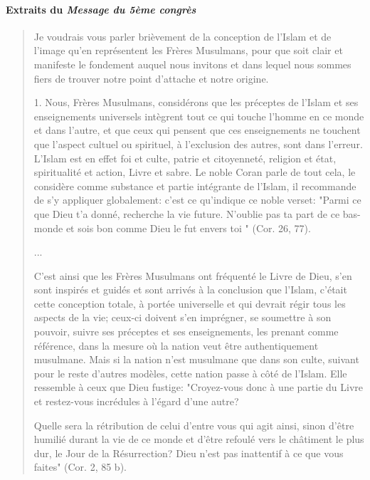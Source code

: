 \paragraph{Extraits du \emph{Message du 5ème congrès} 
}
\begin{quote}
    Je voudrais vous parler brièvement de la conception de l'Islam et de
l'image qu'en représentent les Frères Musulmans, pour que soit clair et
manifeste le fondement auquel nous invitons et dans lequel nous sommes
fiers de trouver notre point d'attache et notre origine.


1.
  Nous, Frères Musulmans, considérons que les préceptes de l'Islam et
  ses enseignements universels intègrent tout ce qui touche l'homme en
  ce monde et dans l'autre, et que ceux qui pensent que ces
  enseignements ne touchent que l'aspect cultuel ou spirituel, à
  l'exclusion des autres, sont dans l'erreur. L'Islam est en effet foi
  et culte, patrie et citoyenneté, religion et état, spiritualité et
  action, Livre et sabre. Le noble Coran parle de tout cela, le
  considère comme substance et partie intégrante de l'Islam, il
  recommande de s'y appliquer globalement: c'est ce qu'indique ce noble
  verset: "Parmi ce que Dieu t'a donné, recherche la vie future.
  N'oublie pas ta part de ce bas-monde et sois bon comme Dieu le fut
  envers toi " (Cor. 26, 77).
  
 

...

C'est ainsi que les Frères Musulmans ont fréquenté le Livre de Dieu,
s'en sont inspirés et guidés et sont arrivés à la conclusion que
l'Islam, c'était cette conception totale, à portée universelle et qui
devrait régir tous les aspects de la vie; ceux-ci doivent s'en
imprégner, se soumettre à son pouvoir, suivre ses préceptes et ses
enseignements, les prenant comme référence, dans la mesure où la nation
veut être authentiquement musulmane. Mais si la nation n'est musulmane
que dans son culte, suivant pour le reste d'autres modèles, cette nation
passe à côté de l'Islam. Elle ressemble à ceux que Dieu fustige:
"Croyez-vous donc à une partie du Livre et restez-vous incrédules à
l'égard d'une autre?

Quelle sera la rétribution de celui d'entre vous qui agit ainsi, sinon
d'être humilié durant la vie de ce monde et d'être refoulé vers le
châtiment le plus dur, le Jour de la Résurrection? Dieu n'est pas
inattentif à ce que vous faites" (Cor. 2, 85 b).



\end{quote}
